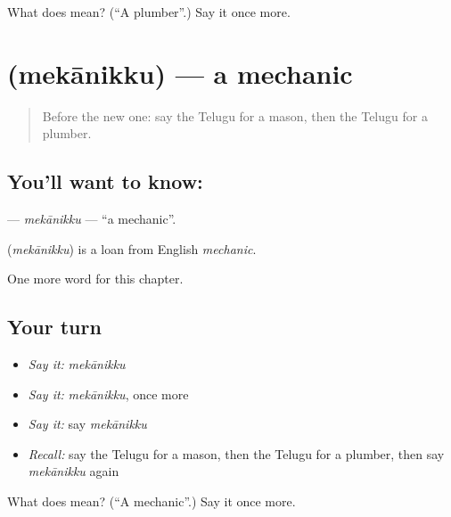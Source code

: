 \begin{tcolorbox}[breakable,colback=teal!4,colframe=teal!35!black,title={Before you move on}]
What does  mean? (\textquotedblleft{}A plumber\textquotedblright{}.) Say it once more.
\end{tcolorbox}
\section[\texorpdfstring{\te{మెకానిక్కు} (mekānikku)}{మెకానిక్కు (mekānikku)}]{ (mekānikku) — a mechanic}

\label{lesson:TE-C314-mekanikku}



\begin{quote}
Before the new one: say the Telugu for a mason, then the Telugu for a plumber.
\end{quote}

\subsection*{You'll want to know: }
\textbf{} — \emph{mekānikku} — \textquotedblleft{}a mechanic\textquotedblright{}.

\begin{cousinweb}
\textbf{} (\emph{mekānikku}) is a loan from English \emph{mechanic}.
\end{cousinweb}

\begin{grammarlens}[title={What you've built}]
One more word for this chapter.
\end{grammarlens}

\subsection*{Your turn}
\begin{itemize}
\raggedright
  \item \emph{Say it:} \emph{mekānikku}
  \item \emph{Say it:} \emph{mekānikku}, once more
  \item \emph{Say it:} say \emph{mekānikku}
  \item \emph{Recall:} say the Telugu for a mason, then the Telugu for a plumber, then say \emph{mekānikku} again
\end{itemize}

\begin{tcolorbox}[breakable,colback=teal!4,colframe=teal!35!black,title={Before you move on}]
What does  mean? (\textquotedblleft{}A mechanic\textquotedblright{}.) Say it once more.
\end{tcolorbox}
